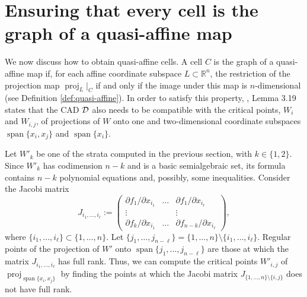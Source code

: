 \documentclass[
]{book}
\theoremstyle{definition}
\theoremstyle{definition}
\theoremstyle{definition}
\theoremstyle{definition}
\theoremstyle{remark}
\begin{document}
\hypertarget{ensuring-that-every-cell-is-the-graph-of-a-quasi-affine-map}{%
\section{Ensuring that every cell is the graph of a quasi-affine map}\label{ensuring-that-every-cell-is-the-graph-of-a-quasi-affine-map}}

We now discuss how to obtain quasi-affine cells. A cell \(C\) is the graph of a quasi-affine map if, for each affine coordinate subspace \(L \subset \mathbb{R}^n\), the restriction of the projection map \(\operatorname{proj}_{L}\vert_C\) if and only if the image under this map is \(n\)-dimensional (see Definition \ref{def:quasi-affine}).
In order to satisfy this property, \citet{bgv15}, Lemma 3.19 states that the CAD \(\cal D\) also needs to be compatible with the critical points, \(W_{i}\) and \(W_{i,j}\), of projections of \(W\) onto one and two-dimensional coordinate subspaces \({\operatorname{span} \{x_i,x_j\}}\) and \({\operatorname{span} \{x_i\}}\).

Let \(W'_k\) be one of the strata computed in the previous section, with \(k\in \{1,2\}\). Since \(W'_k\) has codimension \(n-k\) and is a basic semialgebraic set, its formula contains \(n-k\) polynomial equations and, possibly, some inequalities.
Consider the Jacobi matrix
\[
J_{i_1,\ldots,i_\ell}:=\begin{pmatrix}\partial f_{1}/\partial x_{i_{1}} & \ldots & \partial f_{1}/\partial x_{i_{\ell}}\\
\vdots &  & \vdots\\
\partial f_{k}/\partial x_{i_{1}} & \ldots & \partial f_{n-k}/\partial x_{i_{\ell}}
\end{pmatrix},
\]
where \(\{i_1,\ldots,i_\ell\} \subset \{ 1, \ldots, n \}\). Let \(\{j_1,\ldots,j_{n-\ell}\} = \{ 1 , \ldots, n \} \setminus \{ i_1,\ldots,i_\ell \}\).
Regular points of the projection of \(W'\) onto \({\operatorname{span} \{j_1,\ldots,j_{n - \ell}\}}\) are those at which the matrix \(J_{i_1,\ldots,i_\ell}\) has full rank.
Thus, we can compute the critical points \(W'_{i,j}\) of \({\operatorname{proj}_{{\operatorname{span} \{x_i,x_j\}}}}\) by finding the points at which the Jacobi matrix \(J_{\{1,\ldots,n\} \setminus \{i,j\}}\) does not have full rank.
\end{document}
